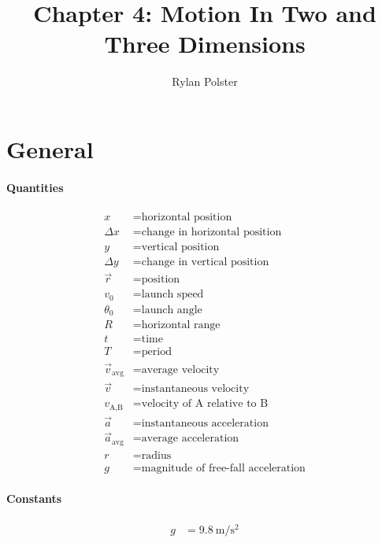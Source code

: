 \documentclass{article}
\title{Chapter 4: Motion In Two and Three Dimensions}
\author{Rylan Polster}
\begin{document}
    \maketitle
    
    \section*{General}

        \paragraph{Quantities}
        \begin{align}
            x &= \text{horizontal position} \nonumber\\
            \Delta x &= \text{change in horizontal position} \nonumber\\
            y &= \text{vertical position} \nonumber\\
            \Delta y &= \text{change in vertical position} \nonumber\\
            \vec{r} &= \text{position} \nonumber\\
            v_0 &= \text{launch speed} \nonumber\\
            \theta_0 &= \text{launch angle} \nonumber\\
            R &= \text{horizontal range} \nonumber\\
            t &= \text{time} \nonumber\\
            T &= \text{period} \nonumber\\
            \vec{v}_\text{avg} &= \text{average velocity} \nonumber\\
            \vec{v} &= \text{instantaneous velocity} \nonumber\\
            v_{\text{A,B}} &= \text{velocity of A relative to B} \nonumber\\
            \vec{a} &= \text{instantaneous acceleration} \nonumber\\
            \vec{a}_\text{avg} &= \text{average acceleration} \nonumber\\
            r &= \text{radius} \nonumber\\
            g &= \text{magnitude of free-fall acceleration} \nonumber
        \end{align}

        \paragraph{Constants}
        \begin{align}
            g &= \SI[per-mode=symbol]{9.8}{\meter\per\square\second} \nonumber
        \end{align}
\end{document}
